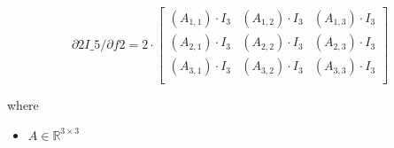 \documentclass[12pt]{article}
\begin{document}
\[
\textit{∂\^2I\_5/∂f\^2} = 2 \cdot \begin{bmatrix}
(\textit{A}_{1, 1}) \cdot I_{ 3 } & (\textit{A}_{1, 2}) \cdot I_{ 3 } & (\textit{A}_{1, 3}) \cdot I_{ 3 }\\
(\textit{A}_{2, 1}) \cdot I_{ 3 } & (\textit{A}_{2, 2}) \cdot I_{ 3 } & (\textit{A}_{2, 3}) \cdot I_{ 3 }\\
(\textit{A}_{3, 1}) \cdot I_{ 3 } & (\textit{A}_{3, 2}) \cdot I_{ 3 } & (\textit{A}_{3, 3}) \cdot I_{ 3 }\\
\end{bmatrix}
\]

where
\begin{itemize}
\item $\textit{A} \in \mathbb{R}^{ 3 \times 3 }$
\end{itemize}
\end{document}
